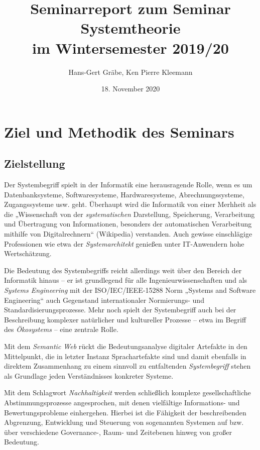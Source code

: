 \documentclass[11pt,a4paper]{article}
\title{Seminarreport zum Seminar \\[6pt] Systemtheorie\\[6pt] im
  Wintersemester 2019/20}
\author{Hans-Gert Gr\"abe, Ken Pierre Kleemann}
\date{18. November 2020}
\begin{document}
\maketitle

\section{Ziel und Methodik des Seminars}

\subsection{Zielstellung}

Der Systembegriff spielt in der Informatik eine herausragende Rolle, wenn es
um Datenbanksysteme, Softwaresysteme, Hardwaresysteme, Abrechnungssysteme,
Zugangssysteme usw. geht.  Überhaupt wird die Informatik von einer Merhheit
als die „Wissenschaft von der \emph{systematischen} Darstellung, Speicherung,
Verarbeitung und Übertragung von Informationen, besonders der automatischen
Verarbeitung mithilfe von Digitalrechnern“ (Wikipedia) verstanden.  Auch
gewisse einschlägige Professionen wie etwa der \emph{Systemarchitekt} genießen
unter IT-Anwendern hohe Wertschätzung.

Die Bedeutung des Systembegriffs reicht allerdings weit über den Bereich der
Informatik hinaus -- er ist grundlegend für alle Ingenieurwissenschaften und
als \emph{Systems Engineering} mit der ISO/IEC/IEEE-15288 Norm „Systems and
Software Engineering“ auch Gegenstand internationaler Normierungs- und
Standardisierungsprozesse.  Mehr noch spielt der Systembegriff auch bei der
Beschreibung komplexer natürlicher und kultureller Prozesse -- etwa im Begriff
des \emph{Ökosystems} -- eine zentrale Rolle.

Mit dem \emph{Semantic Web} rückt die Bedeutungsanalyse digitaler Artefakte in
den Mittelpunkt, die in letzter Instanz Sprachartefakte sind und damit
ebenfalls in direktem Zusammenhang zu einem sinnvoll zu entfaltenden
\emph{Systembegriff} stehen als Grundlage jeden Verständnisses konkreter
Systeme.

Mit dem Schlagwort \emph{Nachhaltigkeit} werden schließlich komplexe
gesellschaftliche Abstimmungsprozesse angesprochen, mit denen vielfältige
Informations- und Bewertungsprobleme einhergehen. Hierbei ist die Fähigkeit
der beschreibenden Abgrenzung, Entwicklung und Steuerung von sogenannten
Systemen auf bzw. über verschiedene Governance-, Raum- und Zeitebenen hinweg
von großer Bedeutung.
\end{document}
